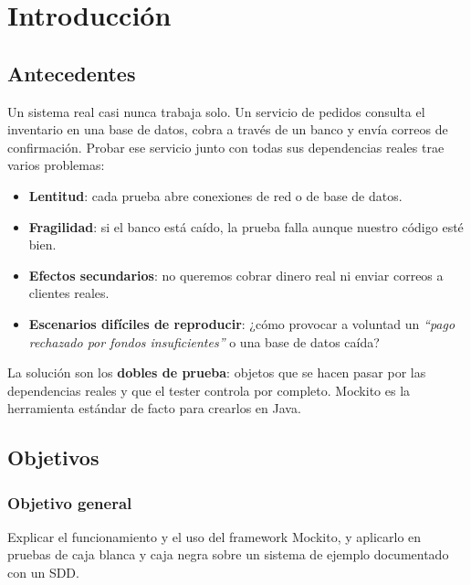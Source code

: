 \documentclass[11pt,a4paper,oneside]{report}
\begin{document}
\tableofcontents
\listoffigures
\listoftables
\lstlistoflistings

\clearpage
{}

\chapter{Introducción}

\section{Antecedentes}
Un sistema real casi nunca trabaja solo. Un servicio de pedidos consulta el inventario en una base de datos, cobra a través de un banco y envía correos de confirmación. Probar ese servicio junto con todas sus dependencias reales trae varios problemas:
\begin{itemize}
  \item \textbf{Lentitud}: cada prueba abre conexiones de red o de base de datos.
  \item \textbf{Fragilidad}: si el banco está caído, la prueba falla aunque nuestro código esté bien.
  \item \textbf{Efectos secundarios}: no queremos cobrar dinero real ni enviar correos a clientes reales.
  \item \textbf{Escenarios difíciles de reproducir}: ¿cómo provocar a voluntad un \emph{``pago rechazado por fondos insuficientes''} o una base de datos caída?
\end{itemize}
La solución son los \textbf{dobles de prueba}: objetos que se hacen pasar por las dependencias reales y que el tester controla por completo. Mockito es la herramienta estándar de facto para crearlos en Java.

\section{Objetivos}
\subsection{Objetivo general}
Explicar el funcionamiento y el uso del framework Mockito, y aplicarlo en pruebas de caja blanca y caja negra sobre un sistema de ejemplo documentado con un SDD.
\end{document}

